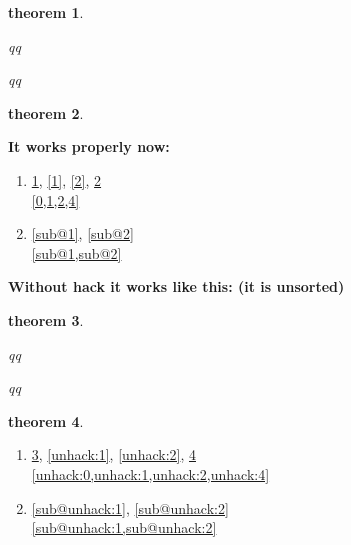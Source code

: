 \documentclass{article}
\makeatletter
\newtheorem{theorem}{theorem}[section]
\def\cref@resetby@list{thmenumii,thmenumi;thmenumi,theorem;} %
\let\cref@old@resetby\cref@resetby
\def\cref@resetby#1#2{%
		\let#2\relax%
		\def\@eatall##1\relax{}%
		\def\@tmpcode##1,##2;{%
			\let\qcy@next\@eatall%
			\ifx,##1,\else
				\ifnum\pdfstrcmp{#1}{##1}=\z@
					\message{Enter @tmpcode, input=##1,##2; command=#1^^J}%
					\def#2{##2}%
				\else
					\let\qcy@next\@tmpcode
				\fi
			\fi
			\qcy@next
		}%
		\expandafter\@tmpcode\cref@resetby@list,;\relax
		\ifx#2\relax%
			\cref@old@resetby{#1}{#2}%
		\fi
	}
\makeatother
\begin{document}
\begin{theorem}
    \label{0}
    \begin{thmenum}[start=4]
        \item q\label{1}q
            \begin{thmenum}[start=3]
                \item q\label{2}q
            \end{thmenum}
    \end{thmenum}
\end{theorem}
\begin{theorem}
\label{4}
\end{theorem}

\textbf{It works properly now:}
\begin{enumerate}[label=Example \arabic*.]
	\item 
	\ref{0}, \ref{1}, \ref{2}, \ref{4} \\
	\cref{0,1,2,4} 
	\item
	\ref{sub@1}, \ref{sub@2} \\
	\cref{sub@1,sub@2}
\end{enumerate}

\textbf{Without hack it works like this: (it is unsorted)}
\makeatletter
\let\cref@resetby\cref@old@resetby
\makeatother
\begin{theorem}
    \label{unhack:0}
    \begin{thmenum}[start=4]
        \item q\label{unhack:1}q
            \begin{thmenum}[start=3]
                \item q\label{unhack:2}q
            \end{thmenum}
    \end{thmenum}
\end{theorem}
\begin{theorem}
\label{unhack:4}
\end{theorem}
\begin{enumerate}[label=Example \arabic*.]
	\item 
	\ref{unhack:0}, \ref{unhack:1}, \ref{unhack:2}, \ref{unhack:4} \\
	\cref{unhack:0,unhack:1,unhack:2,unhack:4} 
	\item
	\ref{sub@unhack:1}, \ref{sub@unhack:2} \\
	\cref{sub@unhack:1,sub@unhack:2}
\end{enumerate}
\end{document}
